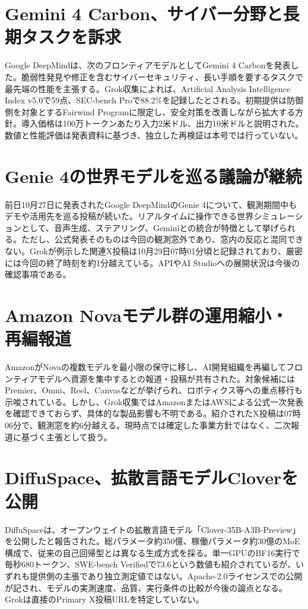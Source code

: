 \section{Gemini 4 Carbon、サイバー分野と長期タスクを訴求}
Google DeepMindは、次のフロンティアモデルとしてGemini 4 Carbonを発表した。脆弱性発見や修正を含むサイバーセキュリティ、長い手順を要するタスクで最先端の性能を主張する。Grok収集によれば、Artificial Analysis Intelligence Index v5.0で59点、SEC-bench Proで88.2\%を記録したとされる。初期提供は防御側を対象とするFairwind Programに限定し、安全対策を改善しながら拡大する方針。導入価格は100万トークンあたり入力2米ドル、出力10米ドルと説明された。数値と性能評価は発表資料に基づき、独立した再検証は本号では行っていない。

\section{Genie 4の世界モデルを巡る議論が継続}
前日10月27日に発表されたGoogle DeepMindのGenie 4について、観測期間中もデモや活用先を巡る投稿が続いた。リアルタイムに操作できる世界シミュレーションとして、音声生成、ステアリング、Geminiとの統合が特徴として挙げられる。ただし、公式発表そのものは今回の観測窓外であり、窓内の反応と混同できない。Grokが例示した関連X投稿は10月29日07時01分頃と記録されており、厳密には今回の終了時刻を約1分越えている。APIやAI Studioへの展開状況は今後の確認事項である。

\section{Amazon Novaモデル群の運用縮小・再編報道}
AmazonがNovaの複数モデルを最小限の保守に移し、AI開発組織を再編してフロンティアモデルへ資源を集中するとの報道・投稿が共有された。対象候補にはPremier、Omni、Reel、Canvasなどが挙げられ、ロボティクス等への重点移行も示唆されている。しかし、Grok収集ではAmazonまたはAWSによる公式一次発表を確認できておらず、具体的な製品影響も不明である。紹介されたX投稿は07時06分で、観測窓を約6分越える。現時点では確定した事業方針ではなく、二次報道に基づく主張として扱う。

\section{DiffuSpace、拡散言語モデルCloverを公開}
DiffuSpaceは、オープンウェイトの拡散言語モデル「Clover-35B-A3B-Preview」を公開したと報告された。総パラメータ約350億、稼働パラメータ約30億のMoE構成で、従来の自己回帰型とは異なる生成方式を採る。単一GPUのBF16実行で毎秒680トークン、SWE-bench Verifiedで73.6という数値も紹介されているが、いずれも提供側の主張であり独立測定値ではない。Apache-2.0ライセンスでの公開が記され、モデルの実測速度、品質、実行条件の比較が今後の論点となる。Grokは直接のPrimary X投稿URLを特定していない。

